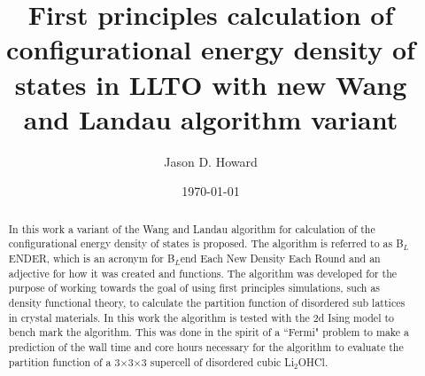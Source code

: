 \documentclass[aps,prl,reprint,superscriptaddress,showkeys]{revtex4-1}
\begin{document}
\title{First principles calculation of configurational energy density of states in LLTO with new Wang and Landau algorithm variant }

\author{Jason D. Howard}

\date{\today}

%


\begin{acknowledgments}
\end{acknowledgments}
\begin{abstract}
In this work  a variant of the Wang and Landau algorithm   for calculation of  the configurational energy density of states is proposed. The algorithm is referred to as B$_L$ENDER, which is an acronym for B$_L$end Each New Density Each Round and an  adjective for  how it was created and functions. The algorithm was developed for the purpose of working towards the goal of using first principles simulations, such as density functional theory, to calculate the partition function of disordered sub lattices in crystal materials. In this work  the algorithm is tested with the 2d Ising model to bench mark the algorithm. This was done in the spirit of a ``Fermi" problem to make a prediction of the  wall time and core hours necessary for the algorithm to evaluate the partition function of a 3$\times$3$\times$3 supercell of disordered cubic Li$_2$OHCl. 
\end{abstract}
\maketitle
\end{document}

